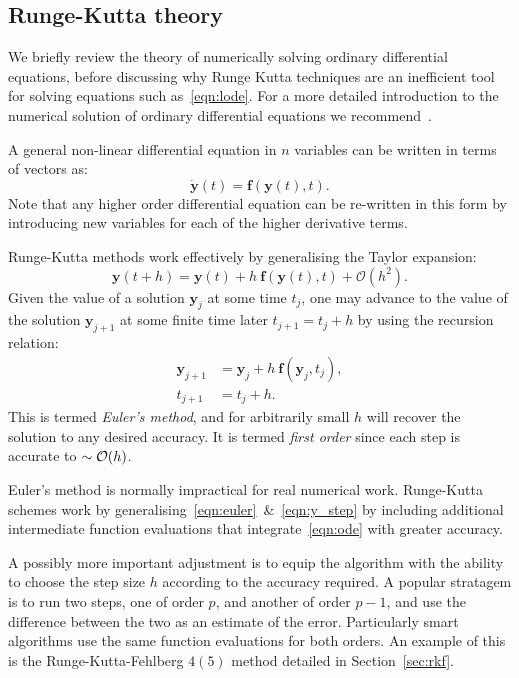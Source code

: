 \subsection{Runge-Kutta theory}
\label{sec:rk}
We briefly review the theory of numerically solving ordinary differential equations, before discussing why Runge Kutta techniques are an inefficient tool for solving equations such as~\eqref{eqn:lode}.
For a more detailed introduction to the numerical solution of ordinary differential equations we recommend~\cite{Press+2007}.

A general non-linear differential equation in \(n\) variables can be written in terms of vectors as:
\begin{equation}
  \dot{\mathbf{y}}(t) = \mathbf{f}(\mathbf{y}(t),t).
  \label{eqn:ode}
\end{equation}
Note that any higher order differential equation can be re-written in this form by introducing new variables for each of the higher derivative terms.

Runge-Kutta methods work effectively by generalising the Taylor expansion:
\begin{equation}
  \mathbf{y}(t+h)  = \mathbf{y}(t) + h\:\mathbf{f}(\mathbf{y}(t),t) + \mathcal{O}(h^2).
  \label{eqn:euler}
\end{equation}
Given the value of a solution \(\mathbf{y}_j\) at some time \(t_j\), one may advance to the value of the solution \(\mathbf{y}_{j+1}\) at some finite time later \(t_{j+1} = t_j + h\) by using the recursion relation:
\begin{align}
  \mathbf{y}_{j+1} &=  \mathbf{y}_{j} + h\:\mathbf{f}(\mathbf{y}_j,t_j),
  \label{eqn:y_step}\\
  t_{j+1} &=  t_{j} + h.
  \label{eqn:t_step}
\end{align}
This is termed {\em Euler's method}, and for arbitrarily small \(h\) will recover the solution to any desired accuracy. It is termed {\em first order\/} since each step is accurate to \({\sim\mathcal{O}{\left(h\right)}}\).

Euler's method is normally impractical for real numerical work. Runge-Kutta schemes work by generalising~\eqref{eqn:euler}~\&~\eqref{eqn:y_step} by including additional intermediate function evaluations that integrate~\eqref{eqn:ode} with greater accuracy.

A possibly more important adjustment is to equip the algorithm with the ability to choose the step size \(h\) according to the accuracy required. A popular stratagem is to run two steps, one of order \(p\), and another of order \(p-1\), and use the difference between the two as an estimate of the error. Particularly smart algorithms use the same function evaluations for both orders. An example of this is the Runge-Kutta-Fehlberg \(4(5)\) method detailed in Section~\ref{sec:rkf}.

